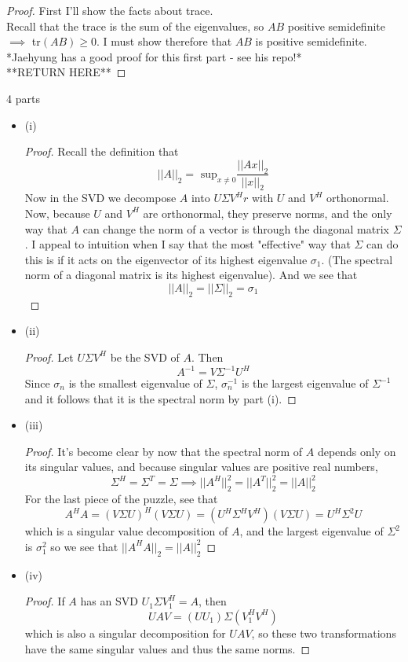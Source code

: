 \documentclass[12pt]{article}
\newenvironment{problem}[2][Problem]{\begin{trivlist}
\item[\hskip \labelsep {\bfseries #1}\hskip \labelsep {\bfseries #2.}]}{\end{trivlist}}
\theoremstyle{definition}
\theoremstyle{definition}
\theoremstyle{definition}
\theoremstyle{definition}
\begin{document}
\begin{problem}{4.28}
\begin{proof}
First I'll show the facts about trace. \\ Recall that the trace is the sum of the eigenvalues, so $AB$ positive semidefinite $\implies$ tr$(AB) \geq 0$. I must show therefore that $AB$ is positive semidefinite. *Jaehyung has a good proof for this first part - see his repo!* \\
**RETURN HERE**
\end{proof}
\end{problem}

\begin{problem}{4.31} 4 parts
\begin{itemize}
\item (i) \begin{proof}
Recall the definition that 
$$||A||_2 = \text{ sup}_{x \neq 0} \frac{||Ax||_2}{||x||_2}$$
Now in the SVD we decompose $A$ into $U\Sigma V^Hr$ with $U$ and $V^H$ orthonormal. Now, because $U$ and $V^H$ are orthonormal, they preserve norms, and the only way that $A$ can change the norm of a vector is through the diagonal matrix $\Sigma$. I appeal to intuition when I say that the most "effective" way that $\Sigma$ can do this is if it acts on the eigenvector of its highest eigenvalue $\sigma_1$. (The spectral norm of a diagonal matrix is its highest eigenvalue). And we see that  $$||A||_2 = ||\Sigma||_2 = \sigma_1$$
\end{proof}  
\item (ii) \begin{proof}
Let $U \Sigma V^H$ be the SVD of $A$. Then 
$$ A^{-1} = V \Sigma^{-1} U^H$$ 
Since $\sigma_n$ is the smallest eigenvalue of $\Sigma$, $\sigma_n^{-1}$ is the largest eigenvalue of $\Sigma^{-1}$ and it follows that it is the spectral norm by part (i).
\end{proof}
\item (iii) \begin{proof}
It's become clear by now that the spectral norm of $A$ depends only on its singular values, and because singular values are positive real numbers, 
$$
\Sigma^H = \Sigma^T = \Sigma \implies ||A^H||_2^2 = ||A^T||_2^2 = ||A||_2^2
$$
For the last piece of the puzzle, see that
$$A^HA = (V \Sigma U)^H(V \Sigma U) = (U^H  \Sigma^H V^H)(V \Sigma U) = U^H \Sigma^2 U$$
which is a singular value decomposition of $A$, and the largest eigenvalue of $\Sigma^2$ is $\sigma_1^2$ so we see that $||A^HA||_2 = ||A||_2^2 $ 
\end{proof}
\item (iv) \begin{proof}
If $A$ has an SVD $U_1 \Sigma V_1^H = A$, then 
$$ UAV = (UU_1) \Sigma (V_1^HV^H) $$
which is also a singular decomposition for $UAV$, so these two transformations have the same singular values and thus the same norms.
\end{proof}
\end{itemize}
\end{problem}
\end{document}
